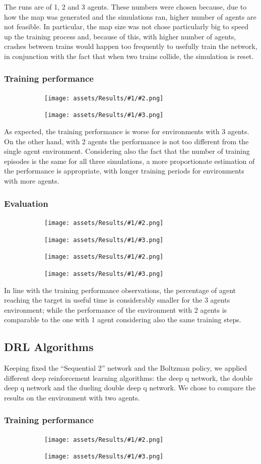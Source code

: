 \documentclass[13pt]{article}
\newcommand{\figrowtwo}[3]{ %
    \begin{figure}[H]
        \centering
        \begin{subfigure}[b]{0.49\textwidth}
            \centering
            \texttt{[image: assets/Results/\#1/\#2.png]}
        \end{subfigure}
        \hfill
        \begin{subfigure}[b]{0.49\textwidth}
            \centering
            \texttt{[image: assets/Results/\#1/\#3.png]}
        \end{subfigure}
    \end{figure}
}
\begin{document}
The runs are of 1, 2 and 3 agents. These numbers were chosen because, due to how the map was generated and the simulations ran, higher number of agents are not feasible. In particular, the map size was not chose particularly big to speed up the training process and, because of this, with higher number of agents, crashes between trains would happen too frequently to usefully train the network, in conjunction with the fact that when two trains collide, the simulation is reset.


\subsubsection*{Training performance}
\figrowtwo{Agents/Train}{reward_mean}{target_reached_in_steps}

As expected, the training performance is worse for environments with 3 agents. On the other hand, with 2 agents the performance is not too different from the single agent environment. Considering also the fact that the number of training episodes is the same for all three simulations, a more proportionate estimation of the performance is appropriate, with longer training periods for environments with more agents.

\subsubsection*{Evaluation}
\figrowtwo{Agents/Test}{reward_mean}{target_reached_in_steps}
\figrowtwo{Agents/Test}{action_mean}{perc_agents_completed}

In line with the training performance observations, the percentage of agent reaching the target in useful time is considerably smaller for the 3 agents environment; while the performance of the environment with 2 agents is comparable to the one with 1 agent considering also the same training steps.


\subsection{DRL Algorithms}
Keeping fixed the “Sequential 2” network and the Boltzman policy, we applied different deep reinforcement learning algorithms: the deep q network, the double deep q network and the dueling double deep q network. We chose to compare the results on the environment with two agents.

\subsubsection*{Training performance}
\figrowtwo{RLAlgorithms/Train}{reward_mean}{target_reached_in_steps}
\end{document}
